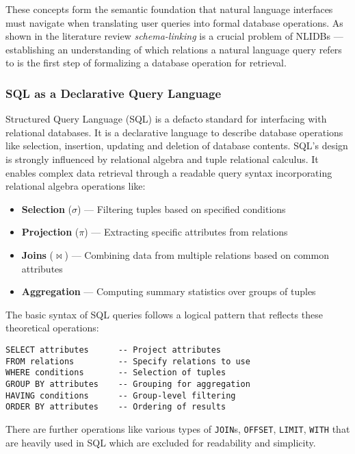 \documentclass{article}
\begin{document}
These concepts form the semantic foundation that natural language interfaces must navigate when translating user queries
into formal database operations. As shown in the literature review \textit{schema-linking} is a crucial problem of
NLIDBs — establishing an understanding of which relations a natural language query refers to is the first step of
formalizing a database operation for retrieval.

\subsubsection{SQL as a Declarative Query Language}

Structured Query Language (SQL) is a defacto standard for interfacing with relational databases. It is a declarative
language to describe database operations like selection, insertion, updating and deletion of database contents. SQL's
design is strongly influenced by relational algebra and tuple relational calculus. It enables complex data retrieval
through a readable query syntax incorporating relational algebra operations like:

\begin{itemize}
    \item \textbf{Selection} ($\sigma$) — Filtering tuples based on specified conditions
    \item \textbf{Projection} ($\pi$) — Extracting specific attributes from relations
    \item \textbf{Joins} ($\bowtie$) — Combining data from multiple relations based on common attributes
    \item \textbf{Aggregation} — Computing summary statistics over groups of tuples
\end{itemize}

The basic syntax of SQL queries follows a logical pattern that reflects these theoretical operations:

\begin{verbatim}
SELECT attributes      -- Project attributes
FROM relations         -- Specify relations to use
WHERE conditions       -- Selection of tuples
GROUP BY attributes    -- Grouping for aggregation
HAVING conditions      -- Group-level filtering
ORDER BY attributes    -- Ordering of results
\end{verbatim}

There are further operations like various types of \texttt{JOIN}s, \texttt{OFFSET}, \texttt{LIMIT}, \texttt{WITH}
that are heavily used in SQL which are excluded for readability and simplicity.
\end{document}
